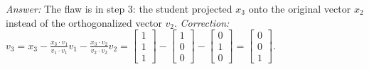 \documentclass[11pt, letterpaper]{article}
\theoremstyle{definition}
\theoremstyle{remark}
\begin{document}
\textit{Answer:} The flaw is in step 3: the student projected $x_3$ onto the original vector $x_2$ instead of the orthogonalized vector $v_2$. 
\textit{Correction:} $v_3 = x_3 - \frac{x_3 \cdot v_1}{v_1 \cdot v_1}v_1 - \frac{x_3 \cdot v_2}{v_2 \cdot v_2}v_2 = \begin{bmatrix} 1 \\ 1 \\ 1 \end{bmatrix} - \begin{bmatrix} 1 \\ 0 \\ 0 \end{bmatrix} - \begin{bmatrix} 0 \\ 1 \\ 0 \end{bmatrix} = \begin{bmatrix} 0 \\ 0 \\ 1 \end{bmatrix}$.
\end{document}
